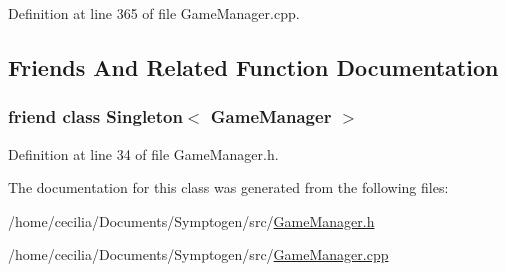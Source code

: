 Definition at line 365 of file Game\-Manager.\-cpp.



\subsection{Friends And Related Function Documentation}
\hypertarget{class_symp_1_1_game_manager_aea7e15ea69de786a42266b0f5cdd4a9c}{
\subsubsection[{Singleton$<$ Game\-Manager $>$}]{\setlength{\rightskip}{0pt plus 5cm}friend class {\bf Singleton}$<$ {\bf Game\-Manager} $>$\hspace{0.3cm}{\ttfamily [friend]}}}\label{class_symp_1_1_game_manager_aea7e15ea69de786a42266b0f5cdd4a9c}


Definition at line 34 of file Game\-Manager.\-h.



The documentation for this class was generated from the following files\-:\begin{DoxyCompactItemize}
\item 
/home/cecilia/\-Documents/\-Symptogen/src/\hyperlink{_game_manager_8h}{Game\-Manager.\-h}\item 
/home/cecilia/\-Documents/\-Symptogen/src/\hyperlink{_game_manager_8cpp}{Game\-Manager.\-cpp}\end{DoxyCompactItemize}
